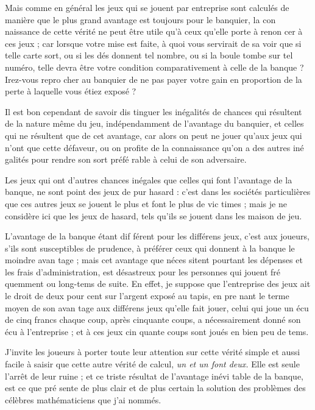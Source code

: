 Mais comme en général les jeux qui
se jouent par entreprise sont calculés
de manière que le plus grand avantage
est toujours pour le banquier, la con%
naissance de cette vérité ne peut être
utile qu'à ceux qu'elle porte à renon%
cer à ces jeux ; car lorsque votre mise
est faite, à quoi vous servirait de sa%
voir que si telle carte sort, ou si les
dés donnent tel nombre, ou si la boule
tombe sur tel numéro, telle devra être
votre condition comparativement à
celle de la banque ? Irez-vous repro%
cher au banquier de ne pas payer 
votre gain en proportion de la perte à
laquelle vous étiez exposé ?

Il est bon cependant de savoir dis%
tinguer les inégalités de chances qui
résultent de la nature même du jeu,
indépendamment de l'avantage du 
banquier, et celles qui ne résultent
que de cet avantage, car alors on peut
ne jouer qu'aux jeux qui n'ont que
cette défaveur, ou on profite de la 
connaissance qu'on a des autres iné%
galités pour rendre son sort préfé%
rable à celui de son adversaire.

Les jeux qui ont d'autres chances
inégales que celles qui font l'avantage
de la banque, ne sont point des jeux
de pur hasard : c'est dans les sociétés
particulières que ces autres jeux se
jouent le plus et font le plus de vic%
times ; mais je ne considère ici que
les jeux de hasard, tels qu'ils se jouent
dans les maison de jeu.

L'avantage de la banque étant dif%
férent pour les différens jeux, c'est
aux joueurs, s'ils sont susceptibles
de prudence, à préférer ceux qui
donnent à la banque le moindre avan%
tage ; mais cet avantage que néces%
sitent pourtant les dépenses et les 
frais d'administration, est désastreux
pour les personnes qui jouent fré%
quemment ou long-tems de suite. En
effet, je suppose que l'entreprise des
jeux ait le droit de deux pour cent 
sur l'argent exposé au tapis, en pre%
nant le terme moyen de son avan%
tage aux différens jeux qu'elle fait
jouer, celui qui joue un écu de cinq
francs chaque coup, après cinquante
coups, a nécessairement donné son
écu à l'entreprise ; et à ces jeux cin%
quante coups sont joués en bien peu
de tems.

J'invite les joueurs à porter toute
leur attention sur cette vérité simple
et aussi facile à saisir que cette autre
vérité de calcul, \emph{un et un font deux.}
Elle est seule l'arrêt de leur ruine ; et
ce triste résultat de l'avantage inévi%
table de la banque, est ce que pré%
sente de plus clair et de plus certain
la solution des problèmes des célèbres
mathématiciens que j'ai nommés.


